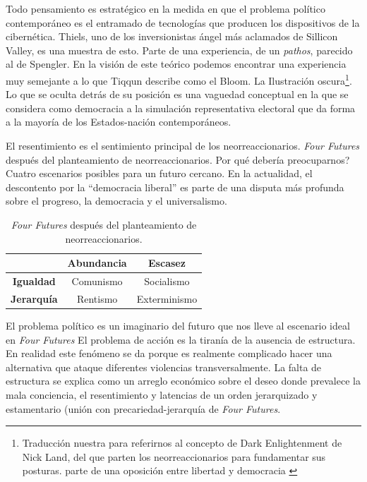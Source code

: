 Todo pensamiento es estratégico en la medida en que el problema político contemporáneo es el entramado de tecnologías que producen los dispositivos de la cibernética. Thiels, uno de los inversionistas ángel más aclamados de Sillicon Valley, es una muestra de esto. Parte de una experiencia, de un \emph{pathos}, parecido al de Spengler. En la visión de este teórico podemos encontrar una experiencia muy semejante a lo que Tiqqun describe como el Bloom. La Ilustración oscura\footnote{Traducción nuestra para referirnos al concepto de Dark Enlightenment de Nick Land, del que parten los neorreaccionarios para fundamentar sus posturas. \autocite{DarkEnlightenmentNick2012} parte de una oposición entre libertad y democracia \autocite[p.~5]{huiUnhappyConsciousnessNeoreactionaries2017}}. Lo que se oculta detrás de su posición es una vaguedad conceptual en la que se considera como democracia a la simulación representativa electoral que da forma a la mayoría de los Estados-nación contemporáneos.

El resentimiento es el sentimiento principal de los neorreaccionarios. \emph{Four Futures} después del planteamiento de neorreaccionarios. Por qué debería preocuparnos? Cuatro escenarios posibles para un futuro cercano. En la actualidad, el descontento por la \enquote{democracia liberal} es parte de una disputa más profunda sobre el progreso, la democracia y el universalismo.

\begin{table}[htb]
  \caption{\emph{Four Futures} después del planteamiento de neorreaccionarios.}
  \label{tab:ubicua}
  \centering

  \begin{tabular}{ccc}
    \toprule
    & \textbf{Abundancia} & \textbf{Escasez}\\
    \midrule
    \textbf{Igualdad} & Comunismo & Socialismo\\
    \textbf{Jerarquía} & Rentismo & Exterminismo\\
    \bottomrule
  \end{tabular}
\end{table}

El problema político es un imaginario del futuro que nos lleve al escenario ideal en \emph{Four Futures} El problema de acción es la tiranía de la ausencia de estructura. En realidad este fenómeno se da porque es realmente complicado hacer una alternativa que ataque diferentes violencias transversalmente. La falta de estructura se explica como un arreglo económico sobre el deseo donde prevalece la mala conciencia, el resentimiento y latencias de un orden jerarquizado y estamentario (unión con precariedad-jerarquía de \emph{Four Futures}.

